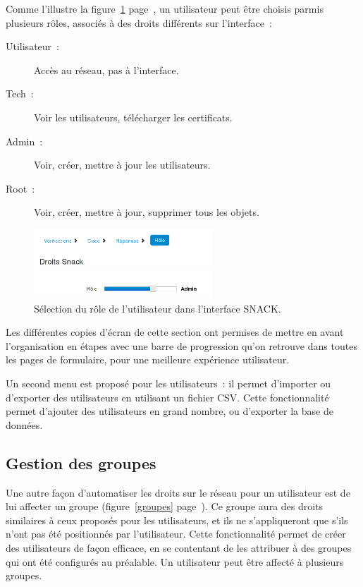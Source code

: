 Comme l'illustre la figure~\ref{snackrole} page~\pageref{snackrole}, un utilisateur peut être choisis parmis plusieurs rôles, associés à des droits différents sur l'interface~:

\begin{description}
\item[Utilisateur~:] Accès au réseau, pas à l'interface.
\item[Tech~:] Voir les utilisateurs, télécharger les certificats.
\item[Admin~:] Voir, créer, mettre à jour les utilisateurs.
\item[Root~:] Voir, créer, mettre à jour, supprimer tous les objets.
\end{description}

\begin{figure}[!h]
	\begin{center}
	    \includegraphics[width=0.6\textwidth]{img/snackrole.png}
	\end{center}
	\caption{Sélection du rôle de l'utilisateur dans l'interface SNACK.}
	\label{snackrole}
\end{figure}

Les différentes copies d'écran de cette section ont permises de mettre en avant l'organisation en étapes avec une barre de progression qu'on retrouve dans toutes les pages de formulaire, pour une meilleure expérience utilisateur.

Un second menu est proposé pour les utilisateurs~: il permet d'importer ou d'exporter des utilisateurs en utilisant un fichier CSV. Cette fonctionnalité permet d'ajouter des utilisateurs en grand nombre, ou d'exporter la base de données.

\subsection{Gestion des groupes}

Une autre façon d'automatiser les droits sur le réseau pour un utilisateur est de lui affecter un groupe (figure~\ref{groupes} page~\pageref{groupes}). Ce groupe aura des droits similaires à ceux proposés pour les utilisateurs, et ils ne s'appliqueront que s'ils n'ont pas été positionnés par l'utilisateur. Cette fonctionnalité permet de créer des utilisateurs de façon efficace, en se contentant de les attribuer à des groupes qui ont été configurés au préalable. Un utilisateur peut être affecté à plusieurs groupes.

